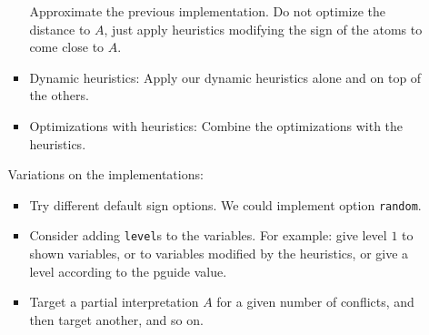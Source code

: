 \documentclass[a4paper,10pt]{article}
\begin{document}
\begin{itemize}
\begin{itemize}
\begin{itemize}
        Approximate the previous implementation. 
        Do not optimize the distance to $A$, 
        just apply heuristics modifying the sign of the atoms to come close to $A$.
        \item
        Dynamic heuristics: Apply our dynamic heuristics alone and on top of the others.
        \item
        Optimizations with heuristics: 
        Combine the optimizations with the heuristics.
    \end{itemize}
    Variations on the implementations:
    \begin{itemize}
        \item
        Try different default sign options. 
        We could implement option \verb|random|.
        \item
        Consider adding \verb|level|s to the variables. 
        For example: give level $1$ to shown variables, 
        or to variables modified by the heuristics, 
        or give a level according to the pguide value.
        \item
        Target a partial interpretation $A$ for a given number of conflicts, 
        and then target another, and so on.
    \end{itemize}
\end{itemize}
\end{itemize}















\end{document}
